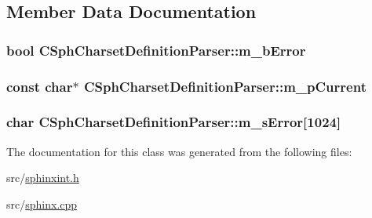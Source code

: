 \subsection{Member Data Documentation}
\hypertarget{classCSphCharsetDefinitionParser_a7f6d8e9db0b43fdc7ff9503ec3944392}{
\subsubsection[{m\-\_\-b\-Error}]{\setlength{\rightskip}{0pt plus 5cm}bool C\-Sph\-Charset\-Definition\-Parser\-::m\-\_\-b\-Error\hspace{0.3cm}{\ttfamily [protected]}}}\label{classCSphCharsetDefinitionParser_a7f6d8e9db0b43fdc7ff9503ec3944392}
\hypertarget{classCSphCharsetDefinitionParser_a1ab6eed0a5c971fa005507684bbcb0b6}{
\subsubsection[{m\-\_\-p\-Current}]{\setlength{\rightskip}{0pt plus 5cm}const char$\ast$ C\-Sph\-Charset\-Definition\-Parser\-::m\-\_\-p\-Current\hspace{0.3cm}{\ttfamily [protected]}}}\label{classCSphCharsetDefinitionParser_a1ab6eed0a5c971fa005507684bbcb0b6}
\hypertarget{classCSphCharsetDefinitionParser_a8912f66545e7904ad4ed0e6b72e319a6}{
\subsubsection[{m\-\_\-s\-Error}]{\setlength{\rightskip}{0pt plus 5cm}char C\-Sph\-Charset\-Definition\-Parser\-::m\-\_\-s\-Error\mbox{[}1024\mbox{]}\hspace{0.3cm}{\ttfamily [protected]}}}\label{classCSphCharsetDefinitionParser_a8912f66545e7904ad4ed0e6b72e319a6}


The documentation for this class was generated from the following files\-:\begin{DoxyCompactItemize}
\item 
src/\hyperlink{sphinxint_8h}{sphinxint.\-h}\item 
src/\hyperlink{sphinx_8cpp}{sphinx.\-cpp}\end{DoxyCompactItemize}
